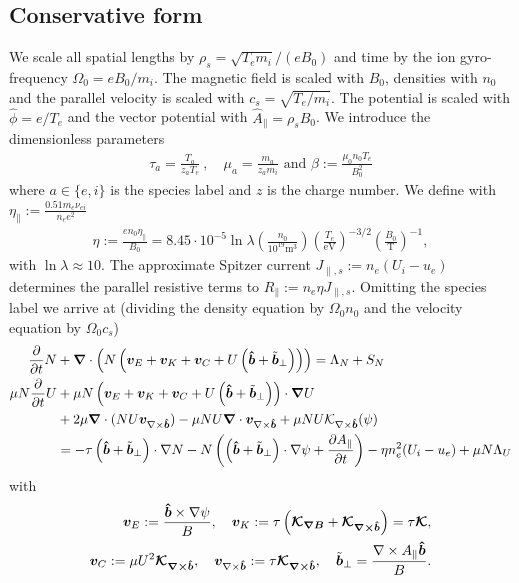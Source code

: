 \subsection{Conservative form}
We scale all spatial lengths by $\rho_s = \sqrt{T_e m_i}/(eB_0)$ and time by the ion gyro-frequency $\Omega_0 = eB_0/m_i$.
The magnetic field is scaled with $B_0$, densities with $n_0$ and the parallel velocity is scaled with $c_s = \sqrt{T_e/m_i}$.
The potential is scaled with $\hat \phi = e/T_e$ and the vector potential with
$\hat A_\parallel = \rho_s B_0$.
We introduce the dimensionless parameters
\begin{align}
  \tau_a = \frac{T_a}{z_aT_e}~,\quad \mu_a = \frac{m_a}{z_am_i}\text{ and } 
  \beta:=\frac{\mu_0 n_0 T_e}{B_0^2}
  \label{}
\end{align}
where $a\in\{e,i\}$ is the species label and $z$ is the charge number. We define with 
$\eta_\parallel := \frac{0.51 m_e \nu_{ei}}{n_e e^2}$
\begin{align}
  \eta:=\frac{en_0\eta_\parallel}{B_0} = 8.45\cdot 10^{-5}\ln \lambda \left(\frac{n_0}{10^{19}\text{m}^3}\right) \left(\frac{T_e}{\text{eV}}\right)^{-3/2} \left(\frac{B_0}{\text{T}}\right)^{-1},
    \label{eq:resistivity}
\end{align}
with $\ln \lambda \approx 10$.
 The approximate Spitzer current \(J_{\parallel,s}:= n_e \left(U_i - u_e\right)\)
 determines the parallel resistive terms to $R_\parallel:= n_e\eta J_{\parallel,s}$.
Omitting the species label we arrive at (dividing the density equation by $\Omega_0n_0$ and the velocity equation by $\Omega_0 c_s$)
\begin{align}
\frac{\partial}{\partial t} N &+ {\boldsymbol{\nabla}}\cdot\left( N \left(
    {\boldsymbol{v}}_E + {\boldsymbol{v}}_K + {\boldsymbol{v}}_{C} + U\left(\bm{\hat{b}} + \tilde{{\boldsymbol{b}}}_\perp\right)\right)\right) = \Lambda_N + S_N \\
\mu N \frac{\partial}{\partial t} U &+ \mu N \left(
    {\boldsymbol{v}}_E + {\boldsymbol{v}}_K + {\boldsymbol{v}}_{C} + U\left(\bm{\hat{b}} + \tilde{{\boldsymbol{b}}}_\perp\right)
    \right)\cdot {\boldsymbol{\nabla}} U  \nonumber \\
    &+ 2\mu {\boldsymbol{\nabla}} \cdot ( NU {\boldsymbol{v}}_{\nabla\times\bm{\hat{b}}})
    -\mu NU{\boldsymbol{\nabla}}\cdot {\boldsymbol{v}}_{\nabla\times\bm{\hat{b}}}
    + \mu NU\mathcal K_{\nabla\times\bm{\hat{b}}}(\psi) \nonumber\\
    &= -\tau \left(\bm{\hat{b}} + \tilde{{\boldsymbol{b}}}_\perp\right)\cdot \nabla N 
    -N \left( \left(\bm{\hat{b}}+\tilde{{\boldsymbol{b}}}_\perp\right)\cdot \nabla \psi + \frac{\partial A_\parallel}{\partial t}\right) 
    - \eta n_e^2(U_i-u_e) + \mu N\Lambda_U
\label{}
\end{align}
with
\begin{align}
{\boldsymbol{v}}_E := \frac{\bm{\hat{b}}\times\nabla\psi}{B},\quad
{\boldsymbol{v}}_{K} := \tau \left({\boldsymbol{\mathcal K_{\nabla B}}} + {\boldsymbol{\mathcal K_{\nabla\times\bm{\hat{b}}}}}\right)=\tau{\boldsymbol{\mathcal K}}  ,\nonumber\\
{\boldsymbol{v}}_C := \mu U^2{\boldsymbol{\mathcal K_{\nabla\times\bm{\hat{b}}}}},\quad
{\boldsymbol{v}}_{\nabla\times\bm{\hat{b}}} := \tau{\boldsymbol{\mathcal K_{\nabla\times\bm{\hat{b}}}}},\quad
\tilde{{\boldsymbol{b}}}_\perp = \frac{\nabla\times A_\parallel \bm{\hat{b}}}{B}.
\label{}
\end{align}

